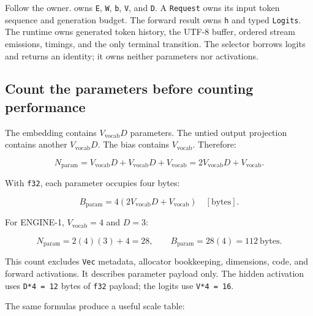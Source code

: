 \documentclass[
  10pt,
]{article}
\begin{document}
Follow the owner. \texttt{} owns \texttt{E},
\texttt{W}, \texttt{b}, \texttt{V}, and \texttt{D}. A \texttt{Request}
owns its input token sequence and generation budget. The forward result
owns \texttt{h} and typed \texttt{Logits}. The runtime owns generated
token history, the UTF-8 buffer, ordered stream emissions, timings, and
the only terminal transition. The selector borrows logits and returns an
identity; it owns neither parameters nor activations.

\subsection{Count the parameters before counting
performance}\label{count-the-parameters-before-counting-performance}

The embedding contains \(V_{\mathrm{vocab}}D\) parameters. The untied
output projection contains another \(V_{\mathrm{vocab}}D\). The bias
contains \(V_{\mathrm{vocab}}\). Therefore:

\[
N_{\mathrm{param}}
=V_{\mathrm{vocab}}D+V_{\mathrm{vocab}}D+V_{\mathrm{vocab}}
=2V_{\mathrm{vocab}}D+V_{\mathrm{vocab}}.
\]

With \texttt{f32}, each parameter occupies four bytes:

\[
B_{\mathrm{param}}
=4\left(2V_{\mathrm{vocab}}D+V_{\mathrm{vocab}}\right)
\quad[\mathrm{bytes}].
\]

For ENGINE-1, \(V_{\mathrm{vocab}}=4\) and \(D=3\):

\[
N_{\mathrm{param}}=2(4)(3)+4=28,
\qquad B_{\mathrm{param}}=28(4)=112\ \mathrm{bytes}.
\]

This count excludes \texttt{Vec} metadata, allocator bookkeeping,
dimensions, code, and forward activations. It describes parameter
payload only. The hidden activation uses \texttt{D*4\ =\ 12} bytes of
\texttt{f32} payload; the logits use \texttt{V*4\ =\ 16}.

The same formulas produce a useful scale table:
\end{document}
